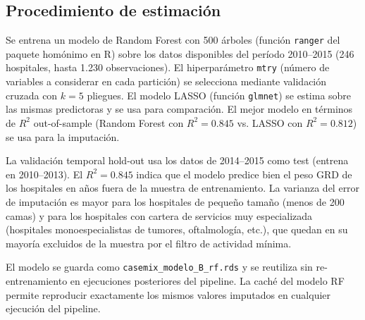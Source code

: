 \subsection{Procedimiento de estimación}

Se entrena un modelo de Random Forest con 500 árboles (función \texttt{ranger} del paquete homónimo en R) sobre los datos disponibles del período 2010--2015 (246 hospitales, hasta 1.230 observaciones). El hiperparámetro \texttt{mtry} (número de variables a considerar en cada partición) se selecciona mediante validación cruzada con $k=5$ pliegues. El modelo LASSO (función \texttt{glmnet}) se estima sobre las mismas predictoras y se usa para comparación. El mejor modelo en términos de $R^2$ out-of-sample (Random Forest con $R^2 = 0.845$ vs. LASSO con $R^2 = 0.812$) se usa para la imputación.

La validación temporal hold-out usa los datos de 2014--2015 como test (entrena en 2010--2013). El $R^2 = 0.845$ indica que el modelo predice bien el peso GRD de los hospitales en años fuera de la muestra de entrenamiento. La varianza del error de imputación es mayor para los hospitales de pequeño tamaño (menos de 200 camas) y para los hospitales con cartera de servicios muy especializada (hospitales monoespecialistas de tumores, oftalmología, etc.), que quedan en su mayoría excluidos de la muestra por el filtro de actividad mínima.

El modelo se guarda como \texttt{casemix\_modelo\_B\_rf.rds} y se reutiliza sin re-entrenamiento en ejecuciones posteriores del pipeline. La caché del modelo RF permite reproducir exactamente los mismos valores imputados en cualquier ejecución del pipeline.


